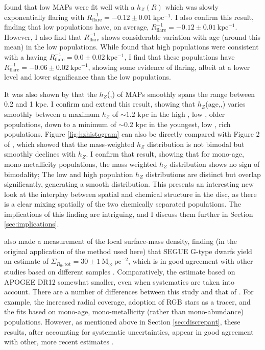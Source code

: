 \citet{2016ApJ...823...30B} found that low \afe{} MAPs were fit well with a $h_Z(R)$ which was slowly exponentially flaring with $R_{\mathrm{flare}}^{-1} = -0.12 \pm 0.01 \ \mathrm{kpc^{-1}}$. I also confirm this result, finding that low \afe{} populations have, on average, $R_{\mathrm{flare}}^{-1} = -0.12 \pm 0.01 \ \mathrm{kpc^{-1}}$. However, I also find that $R_{\mathrm{flare}}^{-1}$ shows considerable variation with age (around this mean) in the low \afe{} populations. While \citet{2016ApJ...823...30B} found that high \afe{} populations were consistent with a having $R_{\mathrm{flare}}^{-1} = 0.0 \pm 0.02\ \mathrm{kpc^{-1}}$, I find that these populations have $R_{\mathrm{flare}}^{-1} = -0.06 \pm 0.02\ \mathrm{kpc^{-1}}$, showing some evidence of flaring, albeit at a lower level and lower significance than the low \afe{} populations.

 It was also shown by \citet{2012ApJ...753..148B,2016ApJ...823...30B} that the $h_Z$(\afe{},\feh{}) of MAPs smoothly spans the range between 0.2 and 1 kpc. I confirm and extend this result, showing that $h_Z$(age,\afe{},\feh{}) varies smoothly between a maximum $h_Z$ of $\sim 1.2$ kpc in the high \afe{}, low \feh{}, older populations, down to a minimum of $\sim 0.2$ kpc in the youngest, low \afe{}, \feh{} rich populations. Figure \ref{fig:hzhistogram} can also be directly compared with Figure 2 of \citet{2012ApJ...751..131B}, which showed that the mass-weighted $h_Z$ distribution is not bimodal but smoothly declines with $h_Z$. I confirm that result, showing that for mono-age, mono-metallicity populations, the mass weighted $h_Z$ distribution shows no sign of bimodality; The low and high \afe{} population $h_Z$ distributions are distinct but overlap significantly, generating a smooth distribution. This presents an interesting new look at the interplay between spatial and chemical structure in the disc, as there is a clear mixing spatially of the two chemically separated populations. The implications of this finding are intriguing, and I discuss them further in Section \ref{sec:implications}.

\citet{2012ApJ...751..131B} also made a measurement of the local surface-mass density, finding (in the original application of the method used here) that SEGUE G-type dwarfs yield an estimate of $\Sigma_{R_0,\text{tot}} = 30 \pm 1\ \mathrm{M_{\odot}\ pc^{-2}}$, which is in good agreement with other studies based on different samples \citep[e.g.][]{2006MNRAS.372.1149F,2015ApJ...814...13M}.  Comparatively, the estimate based on APOGEE DR12 somewhat smaller, even when systematics are taken into account. There are a number of differences between this study and that of \citet{2012ApJ...751..131B}. For example, the increased radial coverage, adoption of RGB stars as a tracer, and the fits based on mono-age, mono-metallicity (rather than mono-abundance) populations. However, as mentioned above in Section \ref{sec:discrepant}, these results, after accounting for systematic uncertainties, appear in good agreement with other, more recent estimates \citep{2015ApJ...814...13M}. 


